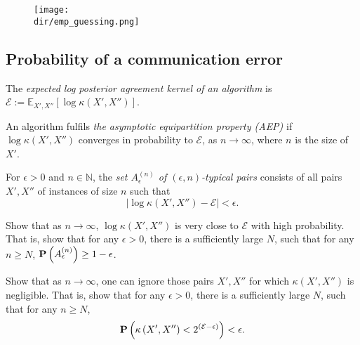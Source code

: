 \begin{figure}
\texttt{[image: \\dir/emp\_guessing.png]}
\caption{}
\label{fig:emp_guessing}
\end{figure}

\subsection{Probability of a communication error}
\label{sub:prob_comm_error}

\begin{definition}
The \emph{expected log posterior agreement kernel of an algorithm} is $\mathcal{E} := \mathbb{E}_{X', X''}\left[\log \kappa\left(X', X''\right)\right]$.
\end{definition}

\begin{definition}
An algorithm fulfils \emph{the asymptotic equipartition property (AEP)} if
$\log \kappa\left(X', X''\right)$ converges in probability to $\mathcal{E}$, as $n \to \infty$, where $n$ is the size of $X'$.
\end{definition}

\begin{definition}
For $\epsilon > 0$ and $n \in \mathbb{N}
$, the \emph{set $A^{(n)}_\epsilon$ of $(\epsilon, n)$-typical pairs} consists of all pairs $X', X''$ of instances of size $n$ such that
%
\begin{equation}
\left|\log \kappa\left(X', X''\right) -  \mathcal{E}\right| < \epsilon.
\end{equation}
%
\end{definition}

\begin{exercise}
Show that as $n \to \infty$, $\log\kappa\left(X', X''\right)$ is very close to $\mathcal{E}$ with high probability. That is, show that for any $\epsilon > 0$, there is a sufficiently large $N$, such that for any $n \geq N$, $\mathbf{P}\left(A^{(n)}_\epsilon\right) \geq 1 - \epsilon$.
\label{ex:almost_all_typical_pa}
\end{exercise}

\begin{exercise}
Show that as $n \to \infty$, one can ignore those pairs $X', X''$ for which $\kappa\left(X', X''\right)$ is negligible. That is, show that for any $\epsilon > 0$, there is a sufficiently large $N$, such that for any $n \geq N$,
%
\begin{equation}
\mathbf{P}\left(\kappa\left(X', X''\right) < 2^{(\mathcal{E} - \epsilon)}\right) < \epsilon.
\end{equation}
%
\label{ex:ignore_negligible_pa}
\end{exercise}

